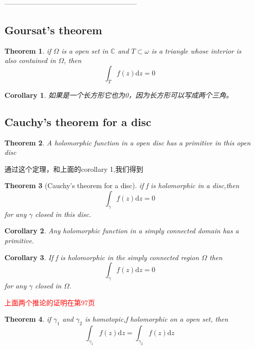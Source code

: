 \documentclass{article}
\newtheorem{theorem}{Theorem}
\newtheorem{corollary}{Corollary}
\begin{document}
———————————————————\par



\newpage
\subsection{Goursat’s theorem}

\begin{theorem}
    if $ \Omega $ is a open set in $ \mathbb{C} $ and $ T \subset  \omega $ is a triangle whose interior is also contained in $ \Omega $, then 
    \begin{equation}
        \int_{T}^{}f(z)\mathrm{d}z=0
    \end{equation}
\end{theorem}
\begin{corollary}
    如果是一个长方形它也为0，因为长方形可以写成两个三角。
\end{corollary}

\subsection{Cauchy’s theorem for a disc}
\begin{theorem}
    A holomorphic function in a open disc has a primitive in this open disc 
\end{theorem}
通过这个定理，和上面的corollary 1,我们得到
\begin{theorem}[Cauchy’s theorem for a disc]
    if f is holomorphic in a disc,then 
    \begin{equation}
        \int_{\gamma}^{}f(z)\mathrm{d}z=0
    \end{equation}
    for any $ \gamma $ closed in this disc.
\end{theorem}

\begin{corollary}
    Any holomorphic function in a simply connected domain has a primitive.
\end{corollary}
\begin{corollary}
    If f is holomorphic in the simply connected region $ \Omega $
then
\begin{equation}
    \int_{\gamma}^{}f(z)\mathrm{d}z=0
\end{equation}
for any $ \gamma $ closed in $ \Omega $.

\end{corollary}

\textcolor{red}{上面两个推论的证明在第97页}
\begin{theorem}
    if $ \gamma_1$ and $ \gamma_2 $ is homotopic,f holomorphic on a open set,  then 
    \begin{equation}
        \int_{\gamma_1}^{}f(z)\mathrm{d}z=\int_{\gamma_2}^{}f(z)\mathrm{d}z
    \end{equation}
\end{theorem}
\end{document}
